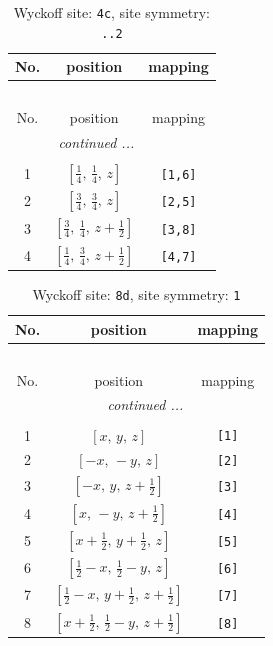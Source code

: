\documentclass[fleqn,8pt]{jsarticle}
\begin{document}
\renewcommand{\arraystretch}{1.2}
\begin{longtable}{ccc}
\caption{Wyckoff site: {\tt 4c}, site symmetry: {\tt ..2}}
 \\
 \hline \hline
No. & position & mapping \\ \hline \endfirsthead

\multicolumn{2}{l}{\tablename\ \thetable{}} \\
 \hline \hline
No. & position & mapping \\ \hline \endhead

 \hline \hline
\multicolumn{2}{r}{\footnotesize\it continued ...} \\ \endfoot

 \hline \hline
\multicolumn{2}{r}{} \\ \endlastfoot

1 & $\left[ \frac{1}{4},\, \frac{1}{4},\, z \right]$ & {\tt [1,6]} \\ \hline
2 & $\left[ \frac{3}{4},\, \frac{3}{4},\, z \right]$ & {\tt [2,5]} \\ \hline
3 & $\left[ \frac{3}{4},\, \frac{1}{4},\, z + \frac{1}{2} \right]$ & {\tt [3,8]} \\ \hline
4 & $\left[ \frac{1}{4},\, \frac{3}{4},\, z + \frac{1}{2} \right]$ & {\tt [4,7]} \\
\end{longtable}
\renewcommand{\arraystretch}{1.2}
\begin{longtable}{ccc}
\caption{Wyckoff site: {\tt 8d}, site symmetry: {\tt 1}}
 \\
 \hline \hline
No. & position & mapping \\ \hline \endfirsthead

\multicolumn{2}{l}{\tablename\ \thetable{}} \\
 \hline \hline
No. & position & mapping \\ \hline \endhead

 \hline \hline
\multicolumn{2}{r}{\footnotesize\it continued ...} \\ \endfoot

 \hline \hline
\multicolumn{2}{r}{} \\ \endlastfoot

1 & $\left[ x,\, y,\, z \right]$ & {\tt [1]} \\ \hline
2 & $\left[ - x,\, - y,\, z \right]$ & {\tt [2]} \\ \hline
3 & $\left[ - x,\, y,\, z + \frac{1}{2} \right]$ & {\tt [3]} \\ \hline
4 & $\left[ x,\, - y,\, z + \frac{1}{2} \right]$ & {\tt [4]} \\ \hline
5 & $\left[ x + \frac{1}{2},\, y + \frac{1}{2},\, z \right]$ & {\tt [5]} \\ \hline
6 & $\left[ \frac{1}{2} - x,\, \frac{1}{2} - y,\, z \right]$ & {\tt [6]} \\ \hline
7 & $\left[ \frac{1}{2} - x,\, y + \frac{1}{2},\, z + \frac{1}{2} \right]$ & {\tt [7]} \\ \hline
8 & $\left[ x + \frac{1}{2},\, \frac{1}{2} - y,\, z + \frac{1}{2} \right]$ & {\tt [8]} \\
\end{longtable}
\end{document}
